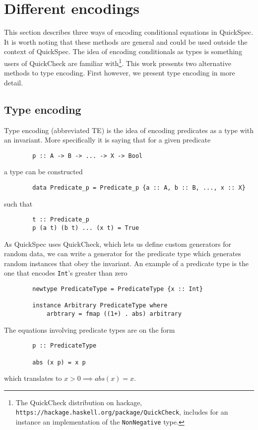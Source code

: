 \section{Different encodings}\label{encodings}

    This section describes three
    ways of encoding conditional
    equations in QuickSpec. It is
    worth noting that these methods
    are general and could be used outside
    the context of QuickSpec. The
    idea of encoding conditionals
    as types is something users of
    QuickCheck\cite{Claessen2000}
    are familiar with\footnote{The QuickCheck distribution
    on hackage, \texttt{https://hackage.haskell.org/package/QuickCheck}, includes for an instance an implementation
    of the \texttt{NonNegative} type.}. 
    This work presents two alternative methods
    to type encoding. First however, we present type encoding
    in more detail.

    \subsection{Type encoding}\label{TE}

        Type encoding (abbreviated TE) is the idea of encoding
        predicates as a type with an invariant.
        More specifically
        it is saying that for a given predicate
        \begin{verbatim}
        p :: A -> B -> ... -> X -> Bool
        \end{verbatim}
        a type can be constructed
        \begin{verbatim}
        data Predicate_p = Predicate_p {a :: A, b :: B, ..., x :: X}
        \end{verbatim}
        such that 
        \begin{verbatim}
        t :: Predicate_p
        p (a t) (b t) ... (x t) = True
        \end{verbatim}
        As QuickSpec uses QuickCheck, which lets us define
        custom generators for random data, we can write a generator for 
        the predicate type which generates random instances that obey the invariant.
        An example of a predicate type is the one that encodes \texttt{Int}'s greater than zero
        \begin{verbatim}
        newtype PredicateType = PredicateType {x :: Int}

        instance Arbitrary PredicateType where
            arbtrary = fmap ((1+) . abs) arbitrary
        \end{verbatim}
        The equations involving predicate types are on the form
        \begin{verbatim}
        p :: PredicateType

        abs (x p) = x p

        \end{verbatim}
        which translates to $x > 0 \implies abs(x) = x$.

